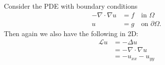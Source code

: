 \documentclass[10pt]{article}
\begin{document}
Consider the PDE with boundary conditions
\begin{subequations}
  \begin{align}
    -\nabla \cdot \nabla u & = f \quad \text{in $\Omega$}\\
                         u & = g \quad \text{on $\partial\Omega$}.
  \end{align}
\end{subequations}
Then again we also have the following in 2D\@:
\begin{equation}
\begin{split}
  \mathcal{L} u & = -\Delta u\\
                & = -\nabla \cdot \nabla u\\
                & = -u_{xx} -u_{yy}
\end{split}
\end{equation}
\end{document}

